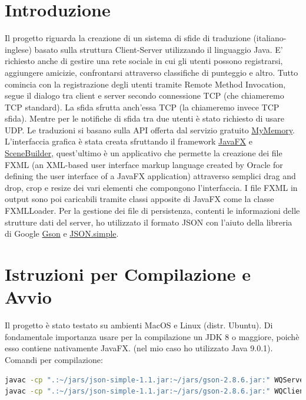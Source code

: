 \documentclass{article}
\begin{document}
\section{Introduzione}
Il progetto riguarda la creazione di un sistema di sfide di traduzione (italiano-inglese) basato sulla struttura Client-Server utilizzando il linguaggio Java. E' richiesto anche di gestire una rete sociale in cui gli utenti possono registrarsi, aggiungere amicizie, confrontarsi attraverso classifiche di punteggio e altro. Tutto comincia con la registrazione degli utenti tramite Remote Method Invocation, segue il dialogo tra client e server secondo connessione TCP (che chiameremo TCP standard). La sfida sfrutta anch'essa TCP (la chiameremo invece TCP sfida). Mentre per le notifiche di sfida tra due utenti è stato richiesto di usare UDP. Le traduzioni si basano sulla API offerta dal servizio gratuito \href{https://mymemory.translated.net/doc/spec.php}{MyMemory}. \\
L'interfaccia grafica è stata creata sfruttando il framework \href{https://docs.oracle.com/javase/8/javafx/get-started-tutorial/jfx-overview.htm}{JavaFX} e \href{https://gluonhq.com/products/scene-builder/}{SceneBuilder}, quest'ultimo è un applicativo che permette la creazione dei file FXML (an XML-based user interface markup language created by Oracle for defining the user interface of a JavaFX application)\cite{FXMLwiki} attraverso semplici drag and drop, crop e resize dei vari elementi che compongono l'interfaccia. I file FXML in output sono poi caricabili tramite classi apposite di JavaFX come la classe FXMLLoader. Per la gestione dei file di persistenza, contenti le informazioni delle strutture dati del server, ho utilizzato il formato JSON con l'aiuto della libreria di Google \href{https://github.com/google/gson/blob/master/UserGuide.md}{Gson} e \href{https://code.google.com/archive/p/json-simple/}{JSON.simple}.

\section{Istruzioni per Compilazione e Avvio}
Il progetto è stato testato su ambienti MacOS e Linux (distr. Ubuntu). Di fondamentale importanza usare per la compilazione un JDK 8 o maggiore, poichè esso contiene nativamente JavaFX. (nel mio caso ho utilizzato Java 9.0.1).\\
Comandi per compilazione:
\begin{lstlisting}[language=bash]
javac -cp ".:~/jars/json-simple-1.1.jar:~/jars/gson-2.8.6.jar:" WQServer.java
javac -cp ".:~/jars/json-simple-1.1.jar:~/jars/gson-2.8.6.jar:" WQClient.java
\end{lstlisting}
\end{document}
